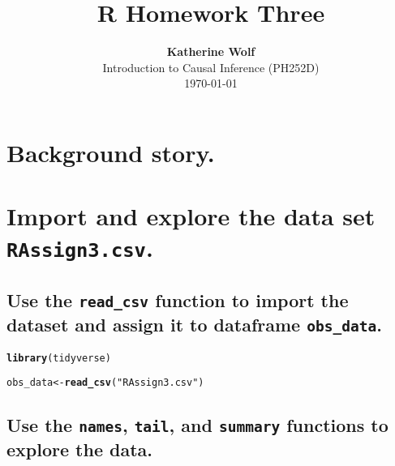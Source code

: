 \documentclass{article}\usepackage[]{graphicx}\usepackage[]{xcolor}
\title{\textbf{R Homework Three}}
\author{\textbf{Katherine Wolf}\\ Introduction to Causal Inference (PH252D)\\ \today}
\date{}
\makeatletter
\newcommand{\hlstr}[1]{\textcolor[rgb]{0.192,0.494,0.8}{#1}}%
\newcommand{\hlstd}[1]{\textcolor[rgb]{0.345,0.345,0.345}{#1}}%
\newcommand{\hlkwb}[1]{\textcolor[rgb]{0.69,0.353,0.396}{#1}}%
\newcommand{\hlkwd}[1]{\textcolor[rgb]{0.737,0.353,0.396}{\textbf{#1}}}%
\newenvironment{kframe}{%
 \def\at@end@of@kframe{}%
 \ifinner\ifhmode%
  \def\at@end@of@kframe{\end{minipage}}%
  \begin{minipage}{\columnwidth}%
 \fi\fi%
 \def\FrameCommand##1{\hskip\@totalleftmargin \hskip-\fboxsep
 \colorbox{shadecolor}{##1}\hskip-\fboxsep
     \hskip-\linewidth \hskip-\@totalleftmargin \hskip\columnwidth}%
 \MakeFramed {\advance\hsize-\width
   \@totalleftmargin\z@ \linewidth\hsize
   \@setminipage}}%
 {\par\unskip\endMakeFramed%
 \at@end@of@kframe}
\newenvironment{knitrout}{}{} %
\makeatother
\begin{document}
\maketitle

\section{Background story.}

\section{Import and explore the data set \texttt{RAssign3.csv}.}

  \subsection{Use the \texttt{read\_csv} function to import the dataset and assign it to dataframe \texttt{obs\_data}.}
  
\begin{knitrout}
\color{fgcolor}\begin{kframe}
\begin{alltt}
\hlkwd{library}\hlstd{(tidyverse)}

\hlstd{obs_data} \hlkwb{<-} \hlkwd{read_csv}\hlstd{(}\hlstr{"RAssign3.csv"}\hlstd{)}
\end{alltt}
\end{kframe}
\end{knitrout}

  \subsection{Use the \texttt{names}, \texttt{tail}, and \texttt{summary} functions to explore the data.}
  
\end{document}
